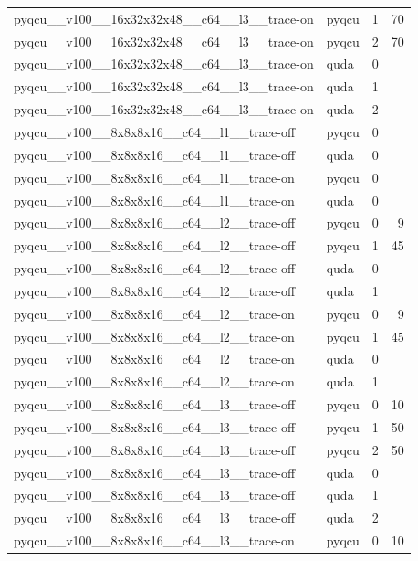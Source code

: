 \begin{table}[htbp]
\begin{tabular}{@{}llrr@{}}
pyqcu\_\_v100\_\_16x32x32x48\_\_c64\_\_l3\_\_trace-on & pyqcu & 1 & 70 \\
pyqcu\_\_v100\_\_16x32x32x48\_\_c64\_\_l3\_\_trace-on & pyqcu & 2 & 70 \\
pyqcu\_\_v100\_\_16x32x32x48\_\_c64\_\_l3\_\_trace-on & quda & 0 &  \\
pyqcu\_\_v100\_\_16x32x32x48\_\_c64\_\_l3\_\_trace-on & quda & 1 &  \\
pyqcu\_\_v100\_\_16x32x32x48\_\_c64\_\_l3\_\_trace-on & quda & 2 &  \\
pyqcu\_\_v100\_\_8x8x8x16\_\_c64\_\_l1\_\_trace-off & pyqcu & 0 &  \\
pyqcu\_\_v100\_\_8x8x8x16\_\_c64\_\_l1\_\_trace-off & quda & 0 &  \\
pyqcu\_\_v100\_\_8x8x8x16\_\_c64\_\_l1\_\_trace-on & pyqcu & 0 &  \\
pyqcu\_\_v100\_\_8x8x8x16\_\_c64\_\_l1\_\_trace-on & quda & 0 &  \\
pyqcu\_\_v100\_\_8x8x8x16\_\_c64\_\_l2\_\_trace-off & pyqcu & 0 & 9 \\
pyqcu\_\_v100\_\_8x8x8x16\_\_c64\_\_l2\_\_trace-off & pyqcu & 1 & 45 \\
pyqcu\_\_v100\_\_8x8x8x16\_\_c64\_\_l2\_\_trace-off & quda & 0 &  \\
pyqcu\_\_v100\_\_8x8x8x16\_\_c64\_\_l2\_\_trace-off & quda & 1 &  \\
pyqcu\_\_v100\_\_8x8x8x16\_\_c64\_\_l2\_\_trace-on & pyqcu & 0 & 9 \\
pyqcu\_\_v100\_\_8x8x8x16\_\_c64\_\_l2\_\_trace-on & pyqcu & 1 & 45 \\
pyqcu\_\_v100\_\_8x8x8x16\_\_c64\_\_l2\_\_trace-on & quda & 0 &  \\
pyqcu\_\_v100\_\_8x8x8x16\_\_c64\_\_l2\_\_trace-on & quda & 1 &  \\
pyqcu\_\_v100\_\_8x8x8x16\_\_c64\_\_l3\_\_trace-off & pyqcu & 0 & 10 \\
pyqcu\_\_v100\_\_8x8x8x16\_\_c64\_\_l3\_\_trace-off & pyqcu & 1 & 50 \\
pyqcu\_\_v100\_\_8x8x8x16\_\_c64\_\_l3\_\_trace-off & pyqcu & 2 & 50 \\
pyqcu\_\_v100\_\_8x8x8x16\_\_c64\_\_l3\_\_trace-off & quda & 0 &  \\
pyqcu\_\_v100\_\_8x8x8x16\_\_c64\_\_l3\_\_trace-off & quda & 1 &  \\
pyqcu\_\_v100\_\_8x8x8x16\_\_c64\_\_l3\_\_trace-off & quda & 2 &  \\
pyqcu\_\_v100\_\_8x8x8x16\_\_c64\_\_l3\_\_trace-on & pyqcu & 0 & 10 \\

\end{tabular}
\end{table}
